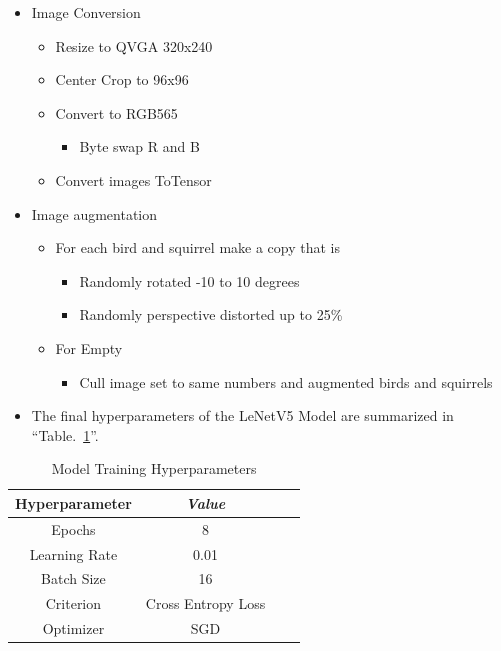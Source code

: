 \documentclass[conference]{IEEEtran}
\begin{document}
\begin{itemize}
	\item Image Conversion
	\begin{itemize}
		\item Resize to QVGA 320x240
		\item Center Crop to 96x96
		\item Convert to RGB565
		\begin{itemize}
			\item Byte swap R and B
		\end{itemize}
		\item Convert images ToTensor
	\end{itemize}
	\item Image augmentation
	\begin{itemize}
		\item For each bird and squirrel make a copy that is
		\begin{itemize}
			\item Randomly rotated -10 to 10 degrees
			\item Randomly perspective distorted up to 25\%
		\end{itemize}
		\item For Empty
		\begin{itemize}
			\item Cull image set to same numbers and augmented birds and squirrels
		\end{itemize}
	\end{itemize}
	\item The final hyperparameters of the  LeNetV5 \cite{leNet} Model are summarized in ``Table.~\ref{hyperparameters}''.
\end{itemize}

\begin{table}[htbp]
\caption{Model Training Hyperparameters}
\begin{center}
\begin{tabular}{|c|c|c|c|}
\hline

\textbf{Hyperparameter} & \textbf{\textit{Value}}    \\ \hline 
Epochs& 8 \\ \hline 
Learning Rate& 0.01 \\ \hline 
Batch Size& 16 \\ \hline 
Criterion& Cross Entropy Loss \\ \hline 
Optimizer& SGD \\ \hline 
\end{tabular}
\label{hyperparameters}
\end{center}
\end{table}
\end{document}
